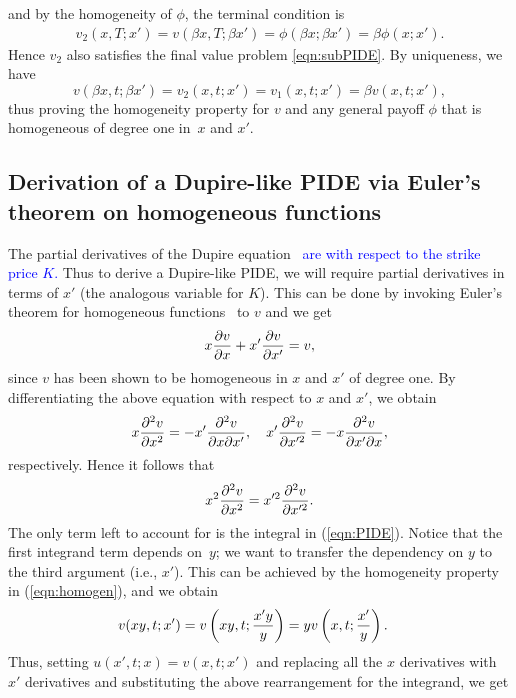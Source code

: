 and by the homogeneity of $\phi$, the terminal condition is
	\begin{align*}
		v_2(x,T;x') = v\left( \beta x, T; \beta x' \right) = \phi(\beta x; \beta x') = \beta \phi(x;x').
	\end{align*}
Hence $v_2$ also satisfies the final value problem \eqref{eqn:subPIDE}. By uniqueness, we have
	\begin{equation*}
		v\left(\beta x, t; \beta x'\right) = v_2(x,t;x') = v_1(x,t;x') = \beta v(x,t;x'),
	\end{equation*}
thus proving the homogeneity property for $v$ and any general payoff $\phi$ that is homogeneous of degree one in~$x$ and $x'$.

\subsection{Derivation of a Dupire-like PIDE via Euler's theorem on homogeneous functions}
The partial derivatives of the Dupire equation~\cite{Gatheral2006} \textcolor{blue}{are with respect to the strike price $K$.} Thus to derive a Dupire-like PIDE, we will require partial derivatives in terms of $x'$ (the analogous variable for $K$). This can be done by invoking Euler's theorem for homogeneous functions~\cite[pp. 317]{Kishan2007} to $v$ and we get
	\begin{equation*}
		x\frac{\partial v}{\partial x} + x'\frac{\partial v}{\partial x'} = v,
	\end{equation*}
since $v$ has been shown to be homogeneous in $x$ and $x'$ of degree one. By differentiating the above equation with respect to $x$ and $x'$, we obtain
	\begin{equation*}
		x\frac{\partial^2 v}{\partial x^2} = -x'\frac{\partial^2 v}{\partial x \partial x'}, \quad x'\frac{\partial^2 v}{\partial x'^2} = -x\frac{\partial^2 v}{\partial x' \partial x},
	\end{equation*}
respectively. Hence it follows that
	\begin{equation*}
		x^2\frac{\partial^2 v}{\partial x^2} = x'^2\frac{\partial^2 v}{\partial x'^2}.
	\end{equation*}
The only term left to account for is the integral in (\ref{eqn:PIDE}). Notice that the first integrand term depends on~$y$; we want to transfer the dependency on $y$ to the third argument (i.e., $x'$). This can be achieved by the homogeneity property in (\ref{eqn:homogen}), and we obtain
	\begin{align*}
		v(xy,t; x') &= v\left(xy,t;\frac{x'y}{y}\right) = yv\left( x,t;\frac{x'}{y} \right).
	\end{align*}
Thus, setting $u(x',t; x) = v(x,t; x')$ and replacing all the $x$ derivatives with $x'$ derivatives and substituting the above rearrangement for the integrand, we get
